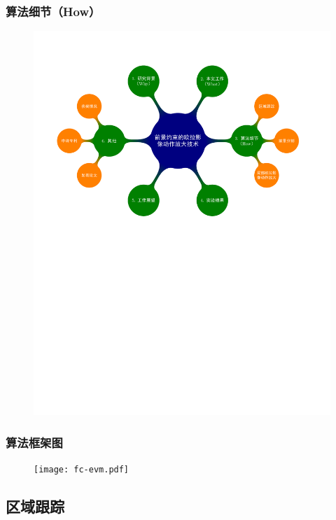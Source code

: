\documentclass[xcolor=svgnames,serif,table]{beamer}
\begin{document}
\begin{frame}
  \frametitle{算法细节（How）}
  \vspace{-2.5em}
  \begin{figure}
    \centering
    \includegraphics[width=\textwidth, page=4]{mindmap.pdf}
  \end{figure}
\end{frame}

\begin{frame}
  \frametitle{算法框架图}
  \begin{figure}
    \centering
    \texttt{[image: fc-evm.pdf]}
  \end{figure}
\end{frame}

\subsection{区域跟踪}
\end{document}
